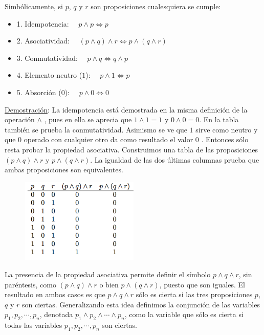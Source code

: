 Simbólicamente, si $p$, $q$ y $r$ son proposiciones cualesquiera se cumple:

\begin{itemize}
\item 1. Idempotencia:  $\quad p \wedge p \Leftrightarrow p$ 
\item 2. Asociatividad: $\quad (p \wedge q) \wedge r \Leftrightarrow p \wedge (q \wedge r)$  
\item 3. Conmutatividad: $\quad p \wedge q \Leftrightarrow q \wedge p$  
\item 4. Elemento neutro ($1$):  $\quad p \wedge 1 \Leftrightarrow p  $
\item 5. Absorción  ($0$):  $\quad p \wedge 0 \Leftrightarrow 0$ 
\end{itemize}

\underline{Demostración}: La idempotencia está demostrada en la misma definición de la operación $\wedge$ , pues en ella se aprecia que $1 \wedge 1 = 1$ y $0 \wedge 0 = 0$. En la tabla también se prueba la conmutatividad. Asimismo se ve que $1$ sirve como neutro y que $0$ operado con cualquier otro da como resultado el valor  $0$ . Entonces sólo resta probar la propiedad asociativa. Construimos una tabla de las proposiciones $(p \wedge q ) \wedge r$ y $p \wedge (q \wedge r)$.
La igualdad de las dos últimas columnas prueba que ambas proposiciones son equivalentes. 

\begin{figure}[H] 
		\centering
		\includegraphics[width=0.5\textwidth]{imagenes/apendices/APENDICESIM24.png}
	\end{figure}
\rightline{$\Box$}

La presencia de la propiedad asociativa permite definir el símbolo $p \wedge q \wedge r$, sin paréntesis, como $(p \wedge q) \wedge r$ o bien $p \wedge (q \wedge r)$, puesto que son iguales. El resultado en ambos casos es que $p \wedge q \wedge r$ sólo es cierta si las tres proposiciones $p$, $q$ y $r$ son ciertas. Generalizando esta idea definimos la conjunción de las variables $p_1, p_2, \cdots, p_n$, denotada $p_1 \wedge p_2 \wedge \cdots \wedge p_n$, como la variable que sólo es cierta si todas las variables $p_1, p_2, \cdots , p_n$ son ciertas. 

